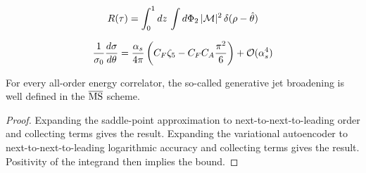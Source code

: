 \begin{equation}
  R(\tau) = \int_0^1 dz \, \int d\Phi_{2} \, |\mathcal{M}|^2 \, \delta(\rho - \hat{\theta})
  \label{eq:3}
\end{equation}

\begin{equation}
  \frac{1}{\sigma_0} \frac{d\sigma}{d\theta} = \frac{\alpha_s}{4\pi} \left( C_F \zeta_{5} - C_F C_A \frac{\pi^2}{6} \right) + \mathcal{O}(\alpha_s^{4})
  \label{eq:4}
\end{equation}

\begin{lemma}\label{thm:4}
For every all-order energy correlator, the so-called generative jet
broadening is well defined in the $\overline{\rm MS}$ scheme.
\end{lemma}

\begin{proof}
Expanding the saddle-point approximation to next-to-next-to-leading
order and collecting terms gives the result. Expanding the variational
autoencoder to next-to-next-to-leading logarithmic accuracy and
collecting terms gives the result. Positivity of the integrand then
implies the bound.
\end{proof}

